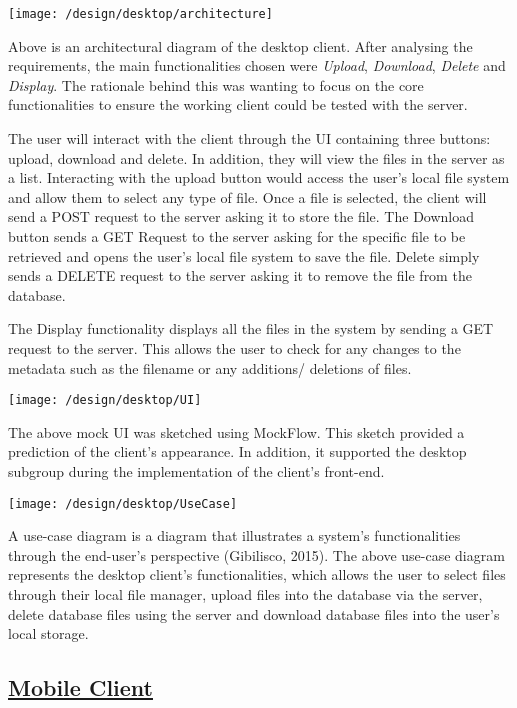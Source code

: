 \documentclass{article}
\begin{document}
\texttt{[image: /design/desktop/architecture]}

Above is an architectural diagram of the desktop client. After analysing the requirements, the main functionalities chosen were \textit{Upload}, \textit{Download}, \textit{Delete} and \textit{Display}. The rationale behind this was wanting to focus on the core functionalities to ensure the working client could be tested with the server.

The user will interact with the client through the UI containing three buttons: upload, download and delete. In addition, they will view the files in the server as a list. Interacting with the upload button would access the user's local file system and allow them to select any type of file. Once a file is selected, the client will send a POST request to the server asking it to store the file. The Download button sends a GET Request to the server asking for the specific file to be retrieved and opens the user's local file system to save the file. Delete simply sends a DELETE request to the server asking it to remove the file from the database.

The Display functionality displays all the files in the system by sending a GET request to the server. This allows the user to check for any changes to the metadata such as the filename or any additions/ deletions of files.

\texttt{[image: /design/desktop/UI]}

The above mock UI was sketched using MockFlow. This sketch provided a prediction of the client's appearance. In addition, it supported the desktop subgroup during the implementation of the client's front-end. 

\texttt{[image: /design/desktop/UseCase]}

A use-case diagram is a diagram that illustrates a system's functionalities through the end-user's perspective (Gibilisco, 2015). The above use-case diagram represents the desktop client's functionalities, which allows the user to select files through their local file manager, upload files into the database via the server, delete database files using the server and download database files into the user's local storage.

\subsection{\underline{Mobile Client}}
\end{document}
